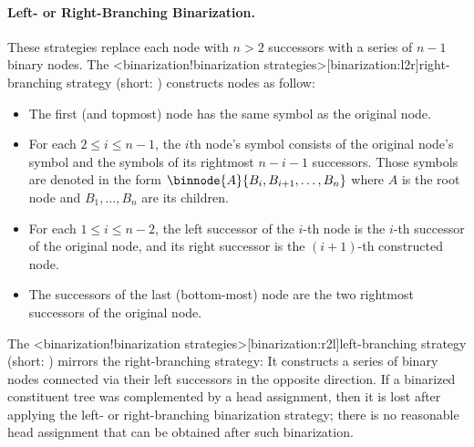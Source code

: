 \documentclass[../../document.tex]{subfiles}
\begin{document}
    \paragraph{Left- or Right-Branching Binarization.}
    These strategies replace each node with \( n>2 \) successors with a series of \( n-1 \) binary nodes.
    The <binarization!binarization strategies>[binarization:l2r]{right-branching strategy} (short: ) constructs nodes as follow:
    \begin{itemize}
        \item The first (and topmost) node has the same symbol as the original node.
        \item For each \(2 \leq i \leq n-1\), the \(i\)th node's symbol consists of the original node's symbol and the symbols of its rightmost \(n-i-1\) successors. Those symbols are denoted in the form \(\binnode{A}{B_i,B_{i+1},\ldots,B_n}\) where \(A\) is the root node and \(B_1, \ldots, B_n\) are its children.
        \item For each \(1 \leq i \leq n-2\), the left successor of the \(i\)-th node is the \(i\)-th successor of the original node, and its right successor is the \((i+1)\)-th constructed node.
        \item The successors of the last (bottom-most) node are the two rightmost successors of the original node.
    \end{itemize}
    The <binarization!binarization strategies>[binarization:r2l]{left-branching strategy} (short: ) mirrors the right-branching strategy: It constructs a series of binary nodes connected via their left successors in the opposite direction.
    If a binarized constituent tree was complemented by a head assignment, then it is lost after applying the left- or right-branching binarization strategy; there is no reasonable head assignment that can be obtained after such binarization.
\end{document}
